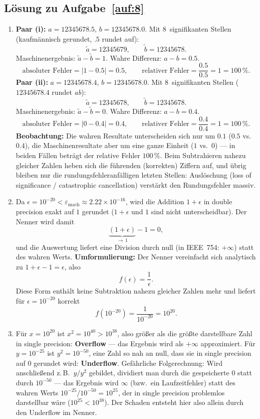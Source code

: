 \documentclass[a4paper,11pt]{scrartcl}
\begin{document}
\subsection*{Lösung zu Aufgabe~\ref{auf:8}}

\begin{enumerate}[label=(\alph*)]
  \item \textbf{Paar (i):} $a = 12345678.5$, $b = 12345678.0$. Mit 8~signifikanten Stellen (kaufmännisch gerundet, $.5$ rundet auf):
  \[
  \tilde{a} = 12345679, \qquad \tilde{b} = 12345678.
  \]
  Maschinenergebnis: $\tilde{a} - \tilde{b} = 1$. Wahre Differenz: $a - b = 0.5$.
  \[
  \text{absoluter Fehler} = |1 - 0.5| = 0.5, \qquad
  \text{relativer Fehler} = \frac{0.5}{0.5} = 1 = 100\,\%.
  \]
  \textbf{Paar (ii):} $a = 12345678.4$, $b = 12345678.0$. Mit 8~signifikanten Stellen ($12345678.4$ rundet \emph{ab}):
  \[
  \tilde{a} = 12345678, \qquad \tilde{b} = 12345678.
  \]
  Maschinenergebnis: $\tilde{a} - \tilde{b} = 0$. Wahre Differenz: $a - b = 0.4$.
  \[
  \text{absoluter Fehler} = |0 - 0.4| = 0.4, \qquad
  \text{relativer Fehler} = \frac{0.4}{0.4} = 1 = 100\,\%.
  \]
  \textbf{Beobachtung:} Die wahren Resultate unterscheiden sich nur um $0.1$ ($0.5$ vs.\ $0.4$), die Maschinenresultate aber um eine ganze Einheit ($1$ vs.\ $0$) --- in beiden Fällen beträgt der relative Fehler $100\,\%$. Beim Subtrahieren nahezu gleicher Zahlen heben sich die führenden (korrekten) Ziffern auf, und übrig bleiben nur die rundungsfehleranfälligen letzten Stellen: Auslöschung (loss of significance / catastrophic cancellation) verstärkt den Rundungsfehler massiv.
  \item Da $\epsilon = 10^{-20} < \varepsilon_{\text{mach}} \approx 2.22 \times 10^{-16}$, wird die Addition $1 + \epsilon$ in double precision exakt auf $1$ gerundet ($1 + \epsilon$ und $1$ sind nicht unterscheidbar). Der Nenner wird damit
  \[
  \underbrace{(1 + \epsilon)}_{\to\, 1} - 1 = 0,
  \]
  und die Auswertung liefert eine Division durch null (in IEEE~754: $+\infty$) statt des wahren Werts. \textbf{Umformulierung:} Der Nenner vereinfacht sich analytisch zu $1 + \epsilon - 1 = \epsilon$, also
  \[
  f(\epsilon) = \frac{1}{\epsilon}.
  \]
  Diese Form enthält keine Subtraktion nahezu gleicher Zahlen mehr und liefert für $\epsilon = 10^{-20}$ korrekt
  \[
  f(10^{-20}) = \frac{1}{10^{-20}} = 10^{20}.
  \]
  \item Für $x = 10^{20}$ ist $x^2 = 10^{40} > 10^{38}$, also größer als die größte darstellbare Zahl in single precision: \textbf{Overflow} --- das Ergebnis wird als $+\infty$ approximiert. Für $y = 10^{-25}$ ist $y^2 = 10^{-50}$, eine Zahl so nah an null, dass sie in single precision auf $0$ gerundet wird: \textbf{Underflow}. Gefährliche Folgerechnung: Wird anschließend z.\,B.\ $y/y^2$ gebildet, dividiert man durch die gespeicherte $0$ statt durch $10^{-50}$ --- das Ergebnis wird $\infty$ (bzw.\ ein Laufzeitfehler) statt des wahren Werts $10^{-25}/10^{-50} = 10^{25}$, der in single precision problemlos darstellbar wäre ($10^{25} < 10^{38}$). Der Schaden entsteht hier also allein durch den Underflow im Nenner.

\end{enumerate}
\end{document}
